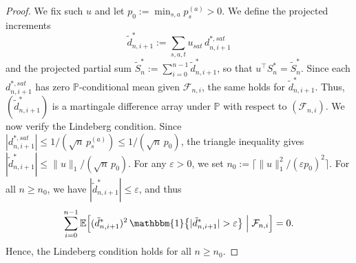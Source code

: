 \documentclass{article}
\numberwithin{equation}{section}
\newcommand{\indicator}{\mathbbm{1}}
\begin{document}
\begin{proof}
We fix such $u$ and let $p_0:=\min_{s,a}p_s^{(a)}>0$. We define the projected increments
\[
\tilde d_{n,i+1}^\ast := \sum_{s,a,t}u_{sat}\,d_{n,i+1}^{\ast,sat}
\]
and the projected partial sum $\tilde S_n^\ast := \sum_{i=0}^{n-1}\tilde d_{n,i+1}^\ast$, so that $u^\top S_n^\ast = \tilde S_n^\ast$. Since each $d_{n,i+1}^{\ast,sat}$ has zero $\mathbb{P}$-conditional mean given $\mathcal{F}_{n,i}$, the same holds for $\tilde d_{n,i+1}^\ast$. Thus, $(\tilde d_{n,i+1}^\ast)$ is a martingale difference array under $\mathbb{P}$ with respect to $(\mathcal{F}_{n,i})$. We now verify the Lindeberg condition. Since $|d_{n,i+1}^{\ast,sat}|\le 1/(\sqrt{n}\,p_s^{(a)})\le 1/(\sqrt{n}\,p_0)$, the triangle inequality gives $|\tilde d_{n,i+1}^\ast|\le \|u\|_1/(\sqrt{n}\,p_0)$. For any $\varepsilon>0$, we set $n_0:=\lceil\|u\|_1^2/(\varepsilon p_0)^2\rceil$. For all $n\ge n_0$, we have $|\tilde d_{n,i+1}^\ast|\le\varepsilon$, and thus
\[
\sum_{i=0}^{n-1}\mathbb{E}\Bigl[(\tilde d_{n,i+1}^\ast)^2\,\indicator\bigl\{|\tilde d_{n,i+1}^\ast|>\varepsilon\bigr\}\;\Big|\;\mathcal{F}_{n,i}\Bigr]=0.
\]
Hence, the Lindeberg condition holds for all $n\ge n_0$.


\end{proof}
\end{document}
